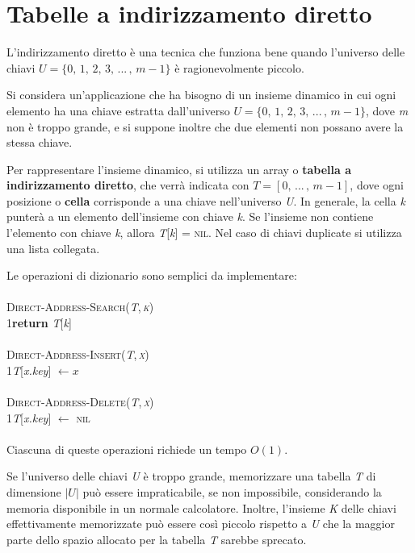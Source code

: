 \documentclass[10pt, a4paper]{report}
\newcommand\firsttab[1][0.5cm]{\hspace*{#1}}
\begin{document}
\section{Tabelle a indirizzamento diretto}
L'indirizzamento diretto è una tecnica che funziona bene quando l'universo delle chiavi $U = \{0,\,1,\,2,\,3,\,...\,,\,m - 1\}$ è ragionevolmente piccolo.

Si considera un'applicazione che ha bisogno di un insieme dinamico in cui ogni elemento ha una chiave estratta dall'universo $U = \{0,\,1,\,2,\,3,\,...\,,\,m - 1\}$, dove \textit{m} non è troppo grande, e si suppone inoltre che due elementi non possano avere la stessa chiave.

Per rappresentare l'insieme dinamico, si utilizza un array o \textbf{tabella a indirizzamento diretto}, che verrà indicata con $T = [0,\,...\,,\,m - 1]$, dove ogni posizione o \textbf{cella} corrisponde a una chiave nell'universo \textit{U}. In generale, la cella \textit{k} punterà a un elemento dell'insieme con chiave \textit{k}. Se l'insieme non contiene l'elemento con chiave \textit{k}, allora \textit{T}[\textit{k}] = \textsc{nil}. Nel caso di chiavi duplicate si utilizza una lista collegata.

Le operazioni di dizionario sono semplici da implementare:\\\\
\textsc{Direct-Address-Search(\textit{T},\,\textit{k})}\\
1\firsttab\textbf{return} \textit{T}[\textit{k}]\\\\
\textsc{Direct-Address-Insert(\textit{T},\,\textit{x})}\\
1\firsttab \textit{T}[\textit{x.key}] $\leftarrow x$\\\\
\textsc{Direct-Address-Delete(\textit{T},\,\textit{x})}\\
1\firsttab \textit{T}[\textit{x.key}] $\leftarrow$ \textsc{nil}\\\\
Ciascuna di queste operazioni richiede un tempo $O(1)$.

Se l'universo delle chiavi \textit{U} è troppo grande, memorizzare una tabella \textit{T} di dimensione $|U|$ può essere impraticabile, se non impossibile, considerando la memoria disponibile in un normale calcolatore. Inoltre, l'insieme \textit{K} delle chiavi effettivamente memorizzate può essere così piccolo rispetto a \textit{U} che la maggior parte dello spazio allocato per la tabella \textit{T} sarebbe sprecato.
\end{document}
